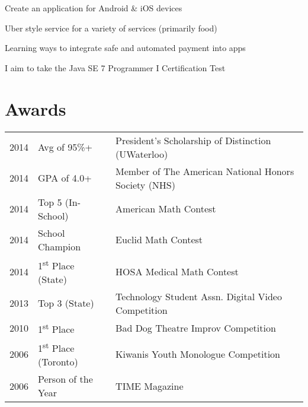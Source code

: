 \documentclass[letterpaper]{deedy-resume} %
\begin{document}
\begin{minipage}[t]{0.66\textwidth}
\begin{tightitemize}
	\item Create an application for Android \& iOS devices
    \item Uber style service for a variety of services (primarily food)
    \item Learning ways to integrate safe and automated payment into apps
\end{tightitemize}

\sectionspace %



\vspace{\topsep} %

\begin{tightitemize}
	\item I aim to take the Java SE 7 Programmer I Certification Test
\end{tightitemize}

\sectionspace %


\section{Awards} 

\begin{tabular}{rll}

2014	 & Avg of 95\%+ & President’s Scholarship of Distinction (UWaterloo)\\
2014	 & GPA of 4.0+ & Member of The American National Honors Society (NHS) \\
2014	 & Top 5 (In-School) & American Math Contest\\
2014	 & School Champion & Euclid Math Contest\\
2014	 & 1\textsuperscript{st} Place (State) & HOSA Medical Math Contest\\
2013 	 & Top 3 (State) & Technology Student Assn. Digital Video Competition \\
2010	 & 1\textsuperscript{st} Place & Bad Dog Theatre Improv Competition \\
2006	 & 1\textsuperscript{st} Place (Toronto) & Kiwanis Youth Monologue Competition \\
2006	 & Person of the Year & TIME Magazine \\
\end{tabular}

\sectionspace %

\end{minipage} %

\end{document}
